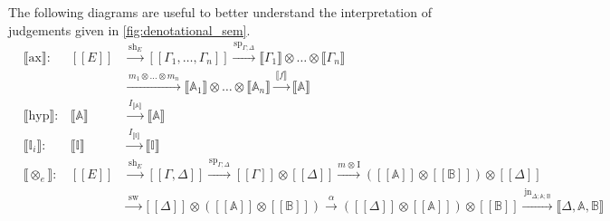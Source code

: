 The following diagrams are useful to better understand the interpretation of judgements given in \autoref{fig:denotational_sem}.
\begin{align*}
  & \llbracket \text{ax} \rrbracket : & [\![E]\!] & \xrightarrow{\hspace{2pt}\text{sh}_{E}\hspace{2pt}}   [\![\Gamma_1,\ldots,\Gamma_n ]\!]   \xrightarrow{\hspace{1pt}\text{sp}_{\Gamma;\Delta}\hspace{1pt}}  \llbracket \Gamma_1 \rrbracket \otimes \ldots \otimes \llbracket \Gamma_n \rrbracket  \\
  & & & \xrightarrow{\hspace{2pt}m_1 \otimes \ldots \otimes m_n \hspace{2pt}} \llbracket \mathbb{A}_1 \rrbracket \otimes \ldots \otimes \llbracket \mathbb{A}_n \rrbracket \xrightarrow{\hspace{2pt}\llbracket f \rrbracket \hspace{2pt}} \llbracket \mathbb{A} \rrbracket \\
  & \llbracket \text{hyp} \rrbracket : & \llbracket \mathbb{A} \rrbracket & \xrightarrow{\hspace{2pt}I_{\llbracket \mathbb{A}\rrbracket}\hspace{2pt}} \llbracket \mathbb{A}\rrbracket \\
  & \llbracket \mathbb{I}_i \rrbracket :&  \llbracket \mathbb{I} \rrbracket & \xrightarrow{\hspace{2pt}I_{\llbracket \mathbb{I}\rrbracket}\hspace{2pt}}  \llbracket \mathbb{I} \rrbracket\\
  &\llbracket \otimes_e \rrbracket : & [\![E]\!] & \xrightarrow{\hspace{2pt}\text{sh}_{E}\hspace{2pt}}   [\![\Gamma,\Delta ]\!]   \xrightarrow{\hspace{1pt}\text{sp}_{\Gamma;\Delta}\hspace{1pt}}  [\![\Gamma ]\!] \otimes [\![\Delta ]\!] \xrightarrow{ m \hspace{1pt} \otimes \hspace{1pt} \text{I}} ([\![\mathbb{A} ]\!] \otimes [\![\mathbb{B} ]\!]) \otimes [\![\Delta ]\!]   \\
     & &  &\xrightarrow{\hspace{2pt}\text{sw}\hspace{2pt}}  [\![\Delta ]\!] \otimes ([\![\mathbb{A} ]\!] \otimes [\![\mathbb{B} ]\!]) \xrightarrow{\hspace{3pt}\alpha\hspace{3pt}}  ([\![\Delta ]\!] \otimes [\![\mathbb{A} ]\!]) \otimes [\![\mathbb{B} ]\!] \xrightarrow{\hspace{2pt}\text{jn}_{\Delta; \mathbb{A}; \mathbb{B} }\hspace{2pt}}  \llbracket \Delta, \mathbb{A},\mathbb{B}  \rrbracket  \\

\end{align*}
